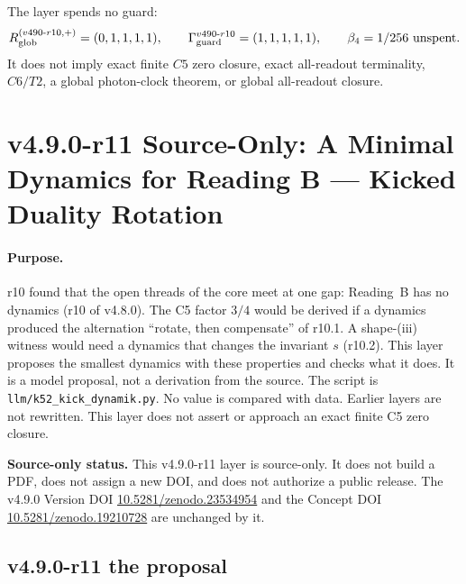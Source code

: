 The layer spends no guard:
\[
R_{\rm glob}^{(v490\text{-}r10,+)}=(0,1,1,1,1),
\qquad
\Gamma_{\rm guard}^{v490\text{-}r10}=(1,1,1,1,1),
\qquad
\beta_4=1/256\ \text{unspent}.
\]
It does not imply exact finite \(C5\) zero closure, exact all-readout terminality,
\(C6/T2\), a global photon-clock theorem, or global all-readout closure.

\clearpage
\section*{v4.9.0-r11 Source-Only: A Minimal Dynamics for Reading B --- Kicked Duality Rotation}
\label{sec:v490-r11-kicked-duality-dynamics}

\paragraph{Purpose.}
r10 found that the open threads of the core meet at one gap: Reading~B has no dynamics (r10 of v4.8.0).  The C5 factor
\(3/4\) would be derived if a dynamics produced the alternation ``rotate, then compensate'' of r10.1.  A shape-(iii) witness
would need a dynamics that changes the invariant \(s\) (r10.2).  This layer proposes the smallest dynamics with these
properties and checks what it does.  It is a model proposal, not a derivation from the source.  The script is
\texttt{llm/k52\_kick\_dynamik.py}.  No value is compared with data.  Earlier layers are not rewritten.
This layer does not assert or approach an exact finite C5 zero closure.

\noindent\textbf{Source-only status.}
This v4.9.0-r11 layer is source-only.  It does not build a PDF, does not assign a new DOI,
and does not authorize a public release.  The v4.9.0 Version DOI
\href{https://doi.org/10.5281/zenodo.23534954}{10.5281/zenodo.23534954} and the Concept DOI
\href{https://doi.org/10.5281/zenodo.19210728}{10.5281/zenodo.19210728} are unchanged by it.

\subsection*{v4.9.0-r11 the proposal}
\label{subsec:v490-r11-proposal}


